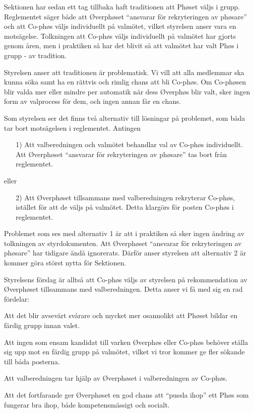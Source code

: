 \documentclass[../_main/handlingar.tex]{subfiles}
\begin{document}

Sektionen har sedan ett tag tillbaka haft traditionen att Phøset väljs i grupp. Reglementet säger både att Øverphøset ``ansvarar för rekryteringen av phøsare'' och att Co-phøs väljs individuellt på valmötet, vilket styrelsen anser vara en motsägelse. Tolkningen att Co-phøs väljs individuellt på valmötet har gjorts genom åren, men i praktiken så har det blivit så att valmötet har valt Phøs i grupp - av tradition.

Styrelsen anser att traditionen är problematisk. Vi vill att alla medlemmar ska kunna söka samt ha en rättvis och rimlig chans att bli Co-phøs. Om Co-phøsen blir valda mer eller mindre per automatik när dess Øverphøs blir valt, sker ingen form av valprocess för dem, och ingen annan får en chans.

Som styrelsen ser det finns två alternativ till lösningar på problemet, som båda tar bort motsägelsen i reglementet. Antingen
\begin{itemize}
    \item[1)] Att valberedningen och valmötet behandlar val av Co-phøs individuellt. Att Øverphøset ``ansvarar för rekryteringen av phøsare'' tas bort från reglementet.
\end{itemize}
eller
\begin{itemize}
    \item[2)] Att Øverphøset tillsammans med valberedningen rekryterar Co-phøs, istället för att de väljs på valmötet. Detta klargörs för posten Co-phøs i reglementet.
\end{itemize}

Problemet som ses med alternativ 1 är att i praktiken så sker ingen ändring av tolkningen av styrdokumenten. Att Øverphøset ``ansvarar för rekryteringen av phøsare'' har tidigare ändå ignorerats. Därför anser styrelsen att alternativ 2 är kommer göra störst nytta för Sektionen.

Styrelsens förslag är alltså att Co-phøs väljs av styrelsen på rekommendation  av Øverphøset tillsammans med valberedningen. Detta anser vi få med sig en rad fördelar:

\begin{dashlist}
    \item Att det blir avsevärt svårare och mycket mer osannolikt att Phøset bildar en färdig grupp innan valet.
    \item Att ingen som ensam kandidat till varken Øverphøs eller Co-phøs behöver ställa sig upp mot en färdig grupp på valmötet, vilket vi tror kommer ge fler sökande till båda posterna.
    \item Att valberedningen tar hjälp av Øverphøset i valberedningen av Co-phøs.
    \item Att det fortfarande ger Øverphøset en god chans att ``pussla ihop'' ett Phøs som fungerar bra ihop, både kompetensmässigt och socialt.
\end{dashlist}
\end{document}
